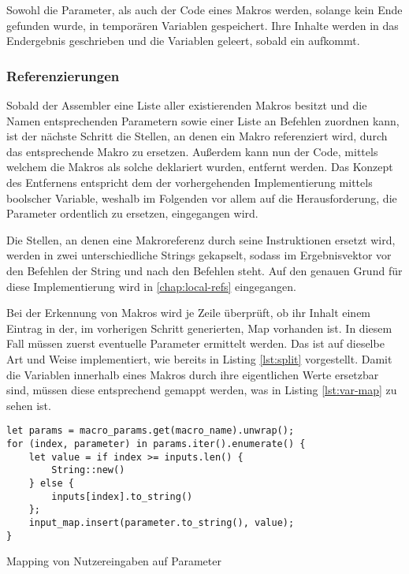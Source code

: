Sowohl die Parameter, als auch der Code eines Makros werden, solange kein Ende gefunden wurde, in temporären Variablen gespeichert. Ihre Inhalte werden in das Endergebnis geschrieben und die Variablen geleert, sobald ein  aufkommt.

\subsubsection{Referenzierungen}

Sobald der Assembler eine Liste aller existierenden Makros besitzt und die Namen entsprechenden Parametern sowie einer Liste an Befehlen zuordnen kann, ist der nächste Schritt die Stellen, an denen ein Makro referenziert wird, durch das entsprechende Makro zu ersetzen. Außerdem kann nun der Code, mittels welchem die Makros als solche deklariert wurden, entfernt werden. Das Konzept des Entfernens entspricht dem der vorhergehenden Implementierung mittels boolscher Variable, weshalb im Folgenden vor allem auf die Herausforderung, die Parameter ordentlich zu ersetzen, eingegangen wird.

Die Stellen, an denen eine Makroreferenz durch seine Instruktionen ersetzt wird, werden in zwei unterschiedliche Strings gekapselt, sodass im Ergebnisvektor vor den Befehlen der String  und nach den Befehlen  steht. Auf den genauen Grund für diese Implementierung wird in \ref{chap:local-refs} eingegangen.

Bei der Erkennung von Makros wird je Zeile überprüft, ob ihr Inhalt einem Eintrag in der, im vorherigen Schritt generierten, Map vorhanden ist. In diesem Fall müssen zuerst eventuelle Parameter ermittelt werden. Das ist auf dieselbe Art und Weise implementiert, wie bereits in Listing \ref{lst:split} vorgestellt. Damit die Variablen innerhalb eines Makros durch ihre eigentlichen Werte ersetzbar sind, müssen diese entsprechend gemappt werden, was in Listing \ref{lst:var-map} zu sehen ist.

\begin{listing}[th]
\begin{verbatim}
let params = macro_params.get(macro_name).unwrap();
for (index, parameter) in params.iter().enumerate() {
	let value = if index >= inputs.len() {
    	String::new()
    } else {
    	inputs[index].to_string()
    };
    input_map.insert(parameter.to_string(), value);
}
\end{verbatim}
\label{lst:var-map}
\caption{Mapping von Nutzereingaben auf Parameter}
\end{listing}

